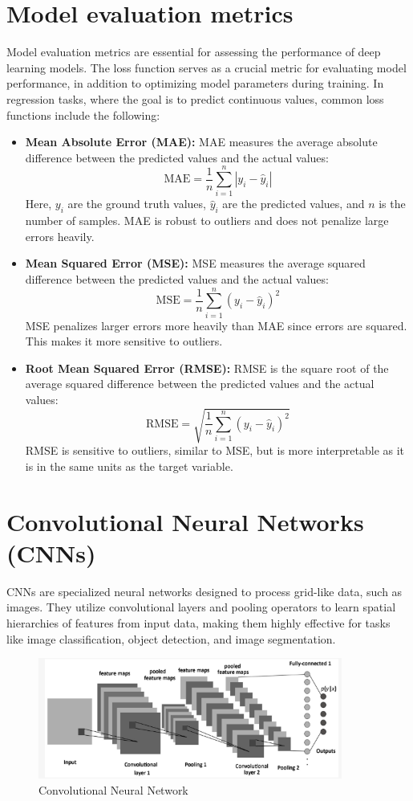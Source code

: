 \section{Model evaluation metrics}
Model evaluation metrics are essential for assessing the performance of deep learning models. The loss function serves as a crucial metric for evaluating model performance, in addition to optimizing model parameters during training. In regression tasks, where the goal is to predict continuous values, common loss functions include the following:
\begin{itemize}
\item \textbf{Mean Absolute Error (MAE):} MAE measures the average absolute difference between the predicted values and the actual values:\[ \text{MAE} = \frac{1}{n} \sum_{i=1}^{n} |y_i - \hat{y}_i| \] Here, $y_i$ are the ground truth values, $\hat{y}_i$ are the predicted values, and $n$ is the number of samples. MAE is robust to outliers and does not penalize large errors heavily.
\item \textbf{Mean Squared Error (MSE):} MSE measures the average squared difference between the predicted values and the actual values:\[ \text{MSE} = \frac{1}{n} \sum_{i=1}^{n} (y_i - \hat{y}_i)^2 \] MSE penalizes larger errors more heavily than MAE since errors are squared. This makes it more sensitive to outliers. 
\item \textbf{Root Mean Squared Error (RMSE):} RMSE is the square root of the average squared difference between the predicted values and the actual values: \[ \text{RMSE} = \sqrt{\frac{1}{n} \sum_{i=1}^{n} (y_i - \hat{y}_i)^2} \]RMSE is sensitive to outliers, similar to MSE, but is more interpretable as it is in the same units as the target variable.
\end{itemize}
\section{Convolutional Neural Networks (CNNs)} \label{cnnse}
CNNs \cite{lecun1998} are specialized neural networks designed to process grid-like data, such as images. They utilize convolutional layers and pooling operators to learn spatial hierarchies of features from input data, making them highly effective for tasks like image classification, object detection, and image segmentation.
\begin{figure}[ht]
    \centering
    \includegraphics[width=10cm]{images/Theory-DL/CNN.png}
    \caption{Convolutional Neural Network}
    \label{fig:CNN}
  \end{figure}
